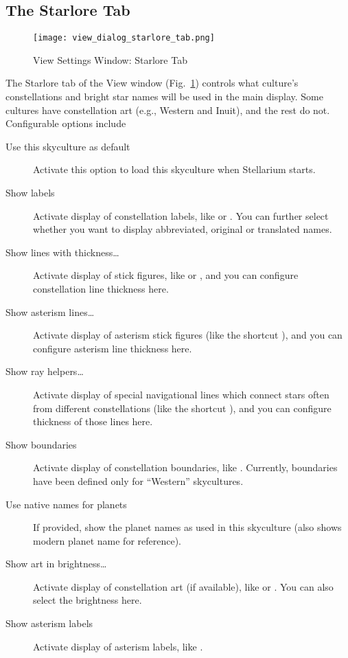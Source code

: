 \subsection{The Starlore Tab}
\label{sec:gui:view:starlore}

\begin{figure}[t]
\centering\texttt{[image: view\_dialog\_starlore\_tab.png]}
\caption{View Settings Window: Starlore Tab}
\label{fig:gui:view:starlore}
\end{figure}

The Starlore tab of the View window (Fig.~\ref{fig:gui:view:starlore})
controls what culture's constellations and bright star names will be
used in the main display.  Some cultures have constellation art (e.g.,
Western and Inuit), and the rest do not. Configurable options include
\begin{description}
\item[Use this skyculture as default] Activate this option to load
  this skyculture when Stellarium starts.
\item[Show labels] Activate display of constellation labels, like
   or . You can further
  select whether you want to display abbreviated, original or
  translated names.
\item[Show lines with thickness\ldots] Activate display of stick
  figures, like  or , and you
  can configure constellation line thickness here.
\item[Show asterism lines\ldots] Activate display of asterism stick figures   
  (like the shortcut ), and you can configure asterism line thickness here.
\item[Show ray helpers\ldots] Activate display of special navigational lines which 
 connect stars often from different constellations (like the shortcut ), and you can configure thickness of those lines here.
\item[Show boundaries] Activate display of constellation boundaries,
  like . Currently, boundaries have been defined only for
  ``Western'' skycultures.
\item[Use native names for planets] If provided, show the planet names
  as used in this skyculture (also shows modern planet name for
  reference). %
\item[Show art in brightness\ldots] Activate display of constellation
  art (if available), like  or
  . You can also select the brightness here.
\item[Show asterism labels] Activate display of asterism labels, like .
\end{description}


